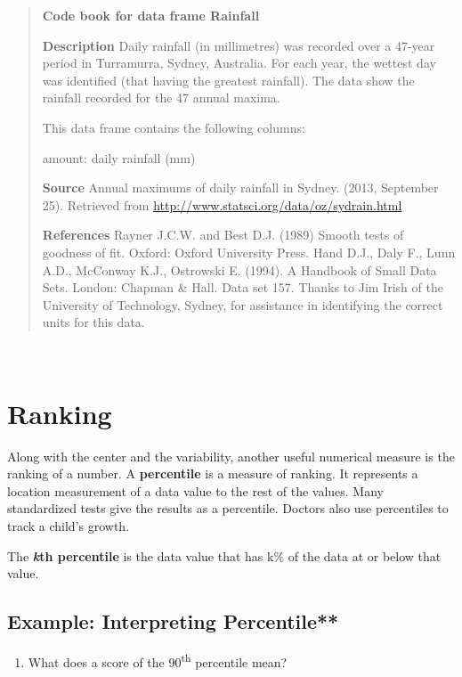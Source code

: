 \documentclass[]{book}
\providecommand{\tightlist}{%
  \setlength{\itemsep}{0pt}\setlength{\parskip}{0pt}}
\begin{document}
\begin{quote}
\textbf{Code book for data frame Rainfall}

\textbf{Description}
Daily rainfall (in millimetres) was recorded over a 47-year period in Turramurra, Sydney, Australia. For each year, the wettest day was identified (that having the greatest rainfall). The data show the rainfall recorded for the 47 annual maxima.

This data frame contains the following columns:

amount: daily rainfall (mm)

\textbf{Source}
Annual maximums of daily rainfall in Sydney. (2013, September 25). Retrieved from
\url{http://www.statsci.org/data/oz/sydrain.html}

\textbf{References}
Rayner J.C.W. and Best D.J. (1989) Smooth tests of goodness of fit. Oxford: Oxford University Press.
Hand D.J., Daly F., Lunn A.D., McConway K.J., Ostrowski E. (1994). A Handbook of Small Data Sets. London: Chapman \& Hall. Data set 157.
Thanks to Jim Irish of the University of Technology, Sydney, for assistance in identifying the correct units for this data.
\end{quote}

\textbf{\\
}

\hypertarget{ranking}{%
\section{Ranking}\label{ranking}}

Along with the center and the variability, another useful numerical
measure is the ranking of a number. A \textbf{percentile} is a measure of
ranking. It represents a location measurement of a data value to the
rest of the values. Many standardized tests give the results as a
percentile. Doctors also use percentiles to track a child's growth.

The \textbf{\emph{k}th percentile} is the data value that has k\% of the data at or
below that value.

\hypertarget{example-interpreting-percentile}{%
\subsection{Example: Interpreting Percentile**}\label{example-interpreting-percentile}}

\begin{enumerate}
\def\labelenumi{\alph{enumi}.}
\tightlist
\item
  What does a score of the 90\textsuperscript{th} percentile mean?
\end{enumerate}
\end{document}
